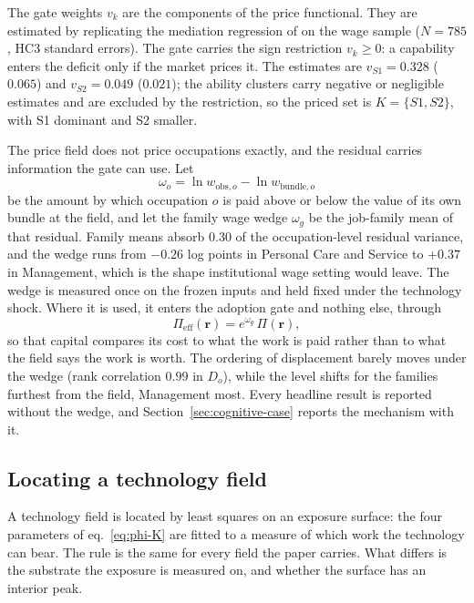 \documentclass[12pt, a4paper]{article}
\begin{document}
The gate weights $v_k$ are the components of the price functional. They
are estimated by replicating the mediation regression of
\textcite{storck2026geometry} on the wage sample ($N=785$, HC3
standard errors). The gate carries the sign restriction $v_k \geq 0$:
a capability enters the deficit only if the market prices it. The
estimates are $v_{S1} = 0.328$ ($0.065$) and $v_{S2} = 0.049$
($0.021$); the ability clusters carry negative or negligible estimates
and are excluded by the restriction, so the priced set is
$K = \{S1, S2\}$, with S1 dominant and S2 smaller.

The price field does not price occupations exactly, and the residual
carries information the gate can use. Let
\[
  \omega_o
  =
  \ln w_{\mathrm{obs},o}
  -
  \ln w_{\mathrm{bundle},o}
\]
be the amount by which occupation $o$ is paid above or below the value
of its own bundle at the field, and let the family wage wedge
$\omega_g$ be the job-family mean of that residual. Family means absorb
$0.30$ of the occupation-level residual variance, and the wedge runs
from $-0.26$ log points in Personal Care and Service to $+0.37$ in
Management, which is the shape institutional wage setting would leave.
The wedge is measured once on the frozen inputs and held fixed under
the technology shock. Where it is used, it enters the adoption gate and
nothing else, through
\[
  \Pi_{\mathrm{eff}}(\mathbf{r}) = e^{\omega_g}\,\Pi(\mathbf{r}),
\]
so that capital compares its cost to what the work is paid rather than
to what the field says the work is worth. The ordering of displacement
barely moves under the wedge (rank correlation $0.99$ in $D_o$), while
the level shifts for the families furthest from the field, Management
most. Every headline result is reported without the wedge, and
Section~\ref{sec:cognitive-case} reports the mechanism with it.

\subsection{Locating a technology field}
\label{sec:technology-calibration}

A technology field is located by least squares on an exposure surface:
the four parameters of eq.~\eqref{eq:phi-K} are fitted to a measure of
which work the technology can bear. The rule is the same for every field
the paper carries. What differs is the substrate the exposure is
measured on, and whether the surface has an interior peak.
\end{document}
